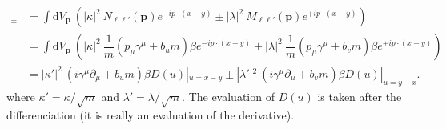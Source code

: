 \documentclass[10pt, a4paper]{article}
\begin{document}
\begin{enumerate}
  \begin{align*}
    [\psi_\ell(x), \psi_{\ell'}^\dagger(y)]_\pm &= \int \text{d}V_\mathbf{p} \ \left(|\kappa|^2 \ N_{\ell \ell'}(\mathbf{p}) e^{-i p \cdot (x - y)} \pm |\lambda|^2 \ M_{\ell \ell'}(\mathbf{p}) e^{+i p \cdot (x - y)}\right)\\
    &=\int \text{d}V_\mathbf{p} \ \left(|\kappa|^2 \ \dfrac{1}{m}(p_\mu \gamma^\mu + b_u m) \beta e^{-i p \cdot (x - y)} \pm |\lambda|^2 \ \dfrac{1}{m}(p_\mu \gamma^\mu + b_v m) \beta e^{+i p \cdot (x - y)}\right)\\
    &= |\kappa'|^2 \ \left(i\gamma^\mu \partial_{\mu} + b_u m\right)\beta D(u)|_{u=x-y} \pm |\lambda'|^2 \ \left(i\gamma^\mu \partial_{\mu} + b_v m\right)\beta D(u)|_{u=y-x}.
  \end{align*}
  where $\kappa' = \kappa/\sqrt{m}$ and $\lambda' = \lambda/\sqrt{m}$. The evaluation of $D(u)$ is taken after the differenciation (it is really an evaluation of the derivative). 
\end{enumerate}
\end{document}
